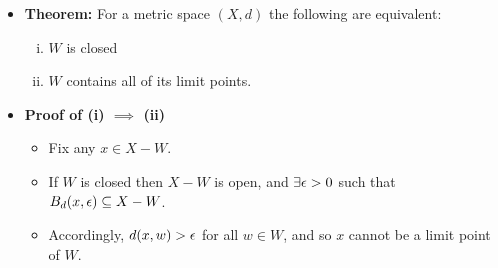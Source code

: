 \documentclass[11pt,twoside]{report}
\begin{document}
\begin{itemize}
%

\item \textbf{Theorem:} For a metric space $(X, d)$ the following are equivalent: 
\begin{enumerate}[(i)]
\item $W$ is closed %
\item $W$ contains all of its limit points. 
\end{enumerate}


\item \textbf{Proof of (i) $\implies$ (ii)}
\begin{itemize}
\item Fix any $x \in X - W$. 
\item If $W$ is closed then  $X - W$ is open, and  $\exists \epsilon > 0$ such that $B_d(x,\epsilon) \subseteq X - W$. 
\item Accordingly,   $d(x,w) > \epsilon$ for all $w \in W$, and so $x$  cannot be a limit point of $W$. 
\end{itemize}



\end{itemize}
\end{document}
